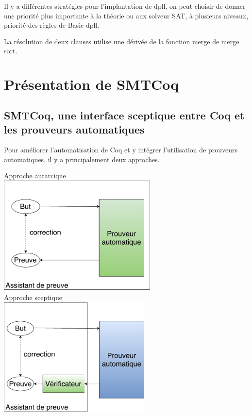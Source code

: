 \documentclass{article}
\begin{document}
Il y a différentes stratégies pour l'implantation de dpll, on peut choisir de donner une priorité plus importante à la théorie ou aux solveur SAT, à plusieurs niveaux, priorité des règles de Basic dpll. 

La résolution de deux clauses utilise une dérivée de la fonction merge de merge sort.

\newpage 
\section{Présentation de SMTCoq}

\subsection{SMTCoq, une interface sceptique entre Coq et les prouveurs automatiques}

Pour améliorer l'automatisation de Coq et y intégrer l'utilisation de prouveurs automatiques, il y a principalement deux approches.

\begin{multicols}{2}
\begin{center}
Approche autarcique\\
\includegraphics[height=6cm]{1_Autarcique.pdf}\\
Approche sceptique\\
\includegraphics[height=6cm]{2_Sceptique.pdf}\\

\end{center}
\end{multicols}
\end{document}
